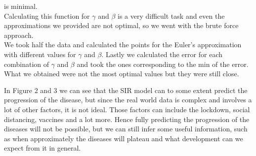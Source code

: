 is minimal.\\

Calculating this function for $\gamma$ and $\beta$ is a very difficult task and even the
approximations we provided are not optimal, so we went with the brute force approach.\\
We took half the data and calculated the points for the Euler's approximation with different values for 
$\gamma$ and $\beta$. Lastly we calculated the error for each combination of $\gamma$ and $\beta$ and took
the ones corresponding to the min of the error. What we obtained were not the most optimal values but they were still 
close. 

In Figure 2 and 3 we can see that the SIR model can to some extent predict the progression of the disease, but since the 
real world data is complex and involves a lot of other factors, it is not ideal. Those factors can include the lockdown, social distancing,
vaccines and a lot more. Hence fully predicting the progression of the diseases will not be possible, but we can still infer some useful information,
such as when approximately the diseases will plateau and what development can we expect from it in general. 